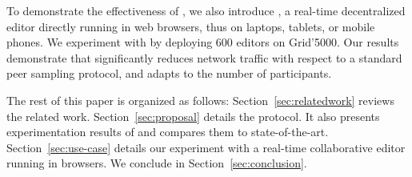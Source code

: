 To demonstrate the effectiveness of \SPRAY, we also introduce \CRATE, a
real-time decentralized editor directly running in web browsers, thus on
laptops, tablets, or mobile phones. We experiment with \CRATE by deploying 600
editors on Grid'5000. Our results demonstrate that \SPRAY significantly reduces
network traffic with respect to a standard peer sampling protocol, and adapts to
the number of participants.

The rest of this paper is organized as follows: Section~\ref{sec:relatedwork}
reviews the related work. Section~\ref{sec:proposal} details the \SPRAY
protocol. It also presents experimentation results of \SPRAY and compares them
to state-of-the-art. Section~\ref{sec:use-case} details our experiment with
\CRATE a real-time collaborative editor running in browsers. We conclude in
Section~\ref{sec:conclusion}.

